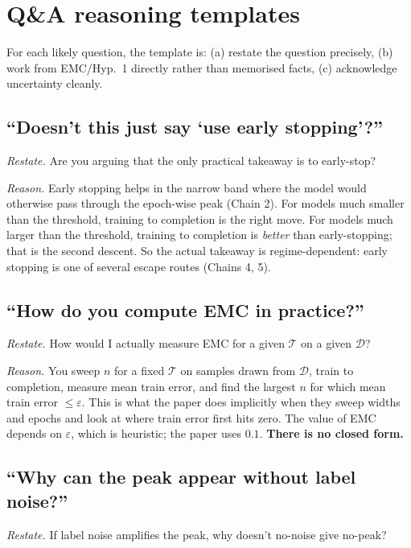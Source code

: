 \documentclass[11pt,a4paper]{article}
\newcommand{\kw}[1]{\textcolor{uompurple}{\textbf{#1}}}
\newcommand{\T}{\mathcal{T}}
\newcommand{\D}{\mathcal{D}}
\theoremstyle{definition}
\begin{document}
\section{Q\&A reasoning templates}

For each likely question, the template is: (a) restate the question precisely, (b) work from EMC/Hyp.~1 directly rather than memorised facts, (c) acknowledge uncertainty cleanly.

\subsection{``Doesn't this just say `use early stopping'?''}

\textit{Restate.} Are you arguing that the only practical takeaway is to early-stop?

\textit{Reason.} Early stopping helps in the narrow band where the model would otherwise pass through the epoch-wise peak (Chain 2). For models much smaller than the threshold, training to completion is the right move. For models much larger than the threshold, training to completion is \emph{better} than early-stopping; that is the second descent. So the actual takeaway is regime-dependent: early stopping is one of several escape routes (Chains 4, 5).

\subsection{``How do you compute EMC in practice?''}

\textit{Restate.} How would I actually measure EMC for a given $\T$ on a given $\D$?

\textit{Reason.} You sweep $n$ for a fixed $\T$ on samples drawn from $\D$, train to completion, measure mean train error, and find the largest $n$ for which mean train error $\le\varepsilon$. This is what the paper does implicitly when they sweep widths and epochs and look at where train error first hits zero. The value of EMC depends on $\varepsilon$, which is heuristic; the paper uses $0.1$. \kw{There is no closed form.}

\subsection{``Why can the peak appear without label noise?''}

\textit{Restate.} If label noise amplifies the peak, why doesn't no-noise give no-peak?
\end{document}
